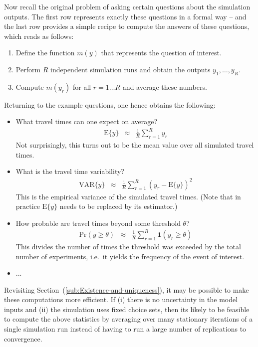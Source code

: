 Now recall the original problem of asking certain questions about
the simulation outputs. The first row 
represents exactly these questions in a formal way -- and the last
row  provides a simple recipe to compute
the answers of these questions, which reads as follows:
\begin{enumerate}
\item Define the function $m(y)$ that represents the question of interest.
\item Perform $R$ independent simulation runs and obtain the outputs $y_{1},\ldots,y_{R}$.
\item Compute $m(y_{r})$ for all $r=1\ldots R$ and average these numbers.
\end{enumerate}
Returning to the example questions, one hence obtains the following:
\begin{itemize}
\item What travel times can one expect on average?
\begin{eqnarray}
\text{E}\{y\} & \approx & \frac{1}{R}\sum_{r=1}^{R}y_{r}
\end{eqnarray}
Not surprisingly, this turns out to be the mean value over all simulated
travel times.
\item What is the travel time variability?
\begin{eqnarray}
\text{VAR}\{y\} & \approx & \frac{1}{R}\sum_{r=1}^{R}(y_{r}-\text{E}\{y\})^{2}
\end{eqnarray}
This is the empirical variance of the simulated travel times. (Note
that in practice $\text{E}\{y\}$ needs to be replaced by its estimator.)
\item How probable are travel times beyond some threshold $\theta$?
\begin{eqnarray}
\text{Pr}(y\geq\theta) & \approx & \frac{1}{R}\sum_{r=1}^{R}\mathbf{1}(y_{r}\geq\theta)
\end{eqnarray}
This divides the number of times the threshold was exceeded by the
total number of experiments, i.e.\ it yields the frequency of the event
of interest.
\item ...
\end{itemize}
Revisiting Section~(\ref{sub:Existence-and-uniqueness}), it may
be possible to make these computations more efficient. If (i) there
is no uncertainty in the model inputs and (ii) the simulation uses
fixed choice sets, then its likely to be feasible to compute the above
statistics by averaging over many stationary iterations of a single
simulation run instead of having to run a large number of replications
to convergence. 


